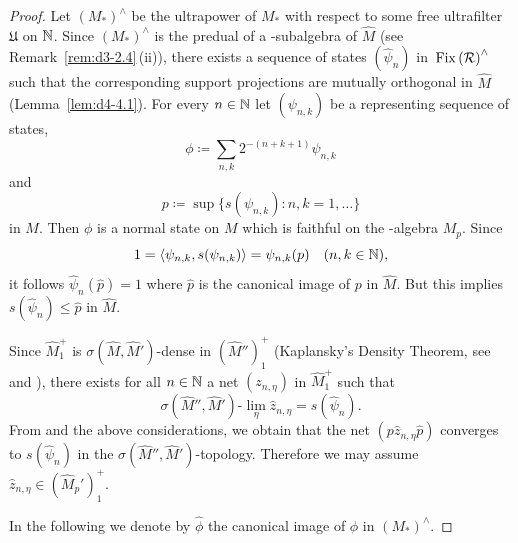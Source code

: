 \begin{proof}
Let $ (M_{*})^{\wedge} $  be the ultrapower of\/ $ M_{*} $  with respect to some free ultrafilter $ \mathfrak{U} $  on $ \mathbb{N} $.
Since $ (M_{*})^{\wedge} $  is the predual of a \WA-subalgebra of\/ $ \widehat{M} $  
(see Remark~\ref{rem:d3-2.4}\,(ii)), there exists a sequence of states $ (\widehat{\psi}_{n}) $  in $ \mathop{}\mathrm{Fix}\left(\mathcal{R}\right)^{\wedge} $  such that the corresponding support projections are mutually orthogonal in $ \widehat{M} $  (Lemma~\ref{lem:d4-4.1}).
For every $ n \in \mathbb{N} $  let $ (\psi_{n,k}) $  be a representing sequence of states, 
\[
\phi \coloneqq \sum_{n,k} 2^{-(n+k+1)} \psi_{n,k}
\]
and 
\[
p \coloneqq \sup\{s(\psi_{n,k}): n,k=1,\ldots\}
\]
in $ M $.
Then $ \phi $  is a normal state on $ M $  which is faithful on the \WA-algebra $ M_{p} $.
Since 
\[
1 = \langle\psi_{n,k},s(\psi_{n,k})\rangle = \psi_{n,k}(p) \quad (n,k \in \mathbb{N}) ,
\]
it follows $ \widehat{\psi}_{n}(\widehat{p}) = 1 $  where $ \widehat{p} $  is the canonical image of\/ $ p $  in $ \widehat{M} $.
But this implies $ s(\widehat{\psi}_{n}) \leq \widehat{p} $  in $ \widehat{M} $.

Since $ \widehat{M}_{1}^{+} $  is $ \sigma(\widehat{M},\widehat{M}') $-dense in $ (\widehat{M}'')_{1}^{+} $  (Kaplansky's Density Theorem, see \textcite[1.9.1]{sakai:1971} and \textcite[1.8.9 and 1.8.12]{sakai:1971}), there exists for all $ n \in \mathbb{N} $  a net $ (z_{n,\eta}) $  in $ \widehat{M}_{1}^{+} $  such that
\[
\sigma(\widehat{M}'',\widehat{M}')\text{-}\lim_{\eta} \hat{z}_{n,\eta} = s(\widehat{\psi}_{n}).
\]
From \textcite[1.7.8]{sakai:1971} and the above considerations, we obtain that the net $ (p\hat{z}_{n,\eta}\widehat{p}) $  converges to $ s(\widehat{\psi}_{n}) $  in the $ \sigma(\widehat{M}'',\widehat{M}') $-topology.
Therefore we may assume $ \hat{z}_{n,\eta} \in (\widehat{M}_{p}')_{1}^{+} $.

In the following we denote by $ \widehat{\phi} $  the canonical image of\/ $ \phi $  in $ (M_{*})^{\wedge} $.


\end{proof}
